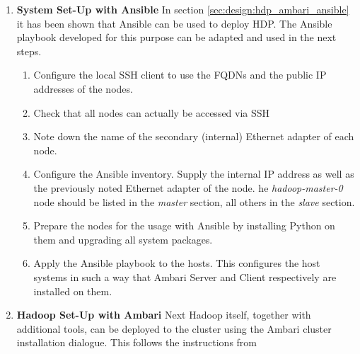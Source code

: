 \begin{enumerate}
    \item \textbf{System Set-Up with Ansible} 
    In section \vref{sec:design:hdp_ambari_ansible} it has been shown that Ansible can be used to deploy \ac{HDP}. The Ansible playbook developed for this purpose can be adapted and used in the next steps.
    \begin{enumerate}
        \item Configure the local \ac{SSH} client to use the \acp{FQDN} and the public \ac{IP} addresses of the nodes. 
        \item Check that all nodes can actually be accessed via \ac{SSH}
        \item Note down the name of the secondary (internal) Ethernet adapter of each node.
        \item Configure the Ansible inventory. Supply the internal \ac{IP} address as well as the previously noted Ethernet adapter of the node. he \emph{hadoop-master-0} node should be listed in the \emph{master} section, all others in the \emph{slave} section.
        \item Prepare the nodes for the usage with Ansible by installing Python on them and upgrading all system packages.
        \item Apply the Ansible playbook to the hosts.
        This configures the host systems in such a way that Ambari Server and Client respectively are installed on them.
    \end{enumerate}
    
    \item \textbf{Hadoop Set-Up with Ambari} 
    Next Hadoop itself, together with additional tools, can be deployed to the cluster using the Ambari cluster installation dialogue. This follows the instructions from \autocite[][Chap.~6]{hortonworks2018install}
    

\end{enumerate}
